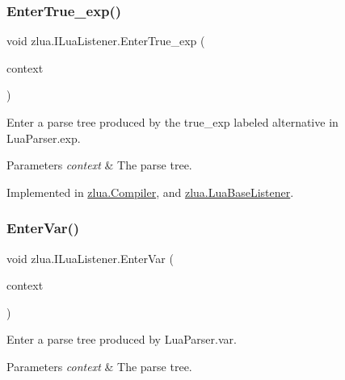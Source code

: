 \subsubsection{\texorpdfstring{Enter\+True\+\_\+exp()}{EnterTrue\_exp()}}
{\footnotesize\ttfamily void zlua.\+I\+Lua\+Listener.\+Enter\+True\+\_\+exp (\begin{DoxyParamCaption}\item[{\mbox{[}\+Not\+Null\mbox{]} \mbox{\hyperlink{classzlua_1_1_lua_parser_1_1_true__exp_context}{Lua\+Parser.\+True\+\_\+exp\+Context}}}]{context }\end{DoxyParamCaption})}



Enter a parse tree produced by the {\ttfamily true\+\_\+exp} labeled alternative in Lua\+Parser.\+exp. 


\begin{DoxyParams}{Parameters}
{\em context} & The parse tree.\\
\hline
\end{DoxyParams}


Implemented in \mbox{\hyperlink{classzlua_1_1_compiler_acaa89ddcb610b21d92f1e3d574c678bf}{zlua.\+Compiler}}, and \mbox{\hyperlink{classzlua_1_1_lua_base_listener_a1c2fbf0cc7a011728a19e25d1cc6f967}{zlua.\+Lua\+Base\+Listener}}.

\mbox{\label{interfacezlua_1_1_i_lua_listener_a1feba01e341c07825901bf0a1cd723e3}} 
\subsubsection{\texorpdfstring{Enter\+Var()}{EnterVar()}}
{\footnotesize\ttfamily void zlua.\+I\+Lua\+Listener.\+Enter\+Var (\begin{DoxyParamCaption}\item[{\mbox{[}\+Not\+Null\mbox{]} \mbox{\hyperlink{classzlua_1_1_lua_parser_1_1_var_context}{Lua\+Parser.\+Var\+Context}}}]{context }\end{DoxyParamCaption})}



Enter a parse tree produced by Lua\+Parser.\+var. 


\begin{DoxyParams}{Parameters}
{\em context} & The parse tree.\\
\hline
\end{DoxyParams}


